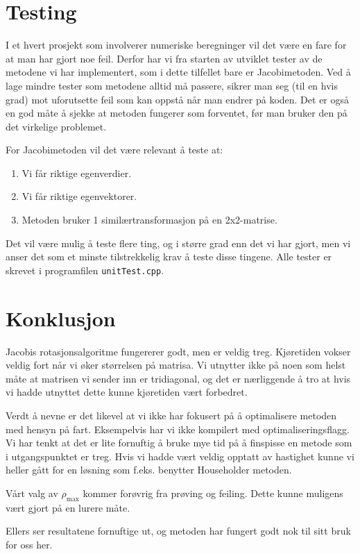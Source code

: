 \documentclass[11pt]{article}
\begin{document}
\section{Testing}
I et hvert prosjekt som involverer numeriske beregninger vil det være
en fare for at man har gjort noe feil. Derfor har vi fra starten av
utviklet tester av de metodene vi har implementert, som i dette
tilfellet bare er Jacobimetoden. Ved å lage mindre tester som metodene
alltid må passere, sikrer man seg (til en hvis grad) mot uforutsette
feil som kan oppstå når man endrer på koden. Det er også en god måte å
sjekke at metoden fungerer som forventet, før man bruker den på det
virkelige problemet. 

For Jacobimetoden vil det være relevant å teste at:
\begin{enumerate}
  \item Vi får riktige egenverdier.
  \item Vi får riktige egenvektorer.
  \item Metoden bruker 1 similærtransformasjon på en 2x2-matrise. 
\end{enumerate}
Det vil være mulig å teste flere ting, og i større grad enn det vi har
gjort, men vi anser det som et minste tilstrekkelig krav å teste disse
tingene. Alle tester er skrevet i programfilen \texttt{unitTest.cpp}. 


\section{Konklusjon}
Jacobis rotasjonsalgoritme fungererer godt, men er veldig treg. Kjøretiden vokser veldig fort når vi øker størrelsen på matrisa. Vi utnytter ikke på noen som
helst måte at matrisen vi sender inn er tridiagonal, og det er nærliggende 
å tro at hvis vi hadde utnyttet dette kunne kjøretiden vært
forbedret. 

Verdt å nevne er det likevel at vi ikke har fokusert på å optimalisere
metoden med hensyn på fart. Eksempelvis har vi ikke kompilert med
optimaliseringsflagg. Vi har tenkt at det er lite fornuftig å bruke
mye tid på å finspisse en metode som i utgangspunktet er treg. Hvis vi
hadde vært veldig opptatt av hastighet kunne vi heller gått for en
løsning som f.eks. benytter Householder metoden. 

Vårt valg av $\rho_\text{max}$ kommer forøvrig fra prøving og
feiling. Dette kunne muligens vært gjort på en lurere måte. 

Ellers ser resultatene fornuftige ut, og metoden har fungert godt nok til
sitt bruk for oss her.


\printbibliography
\end{document}
